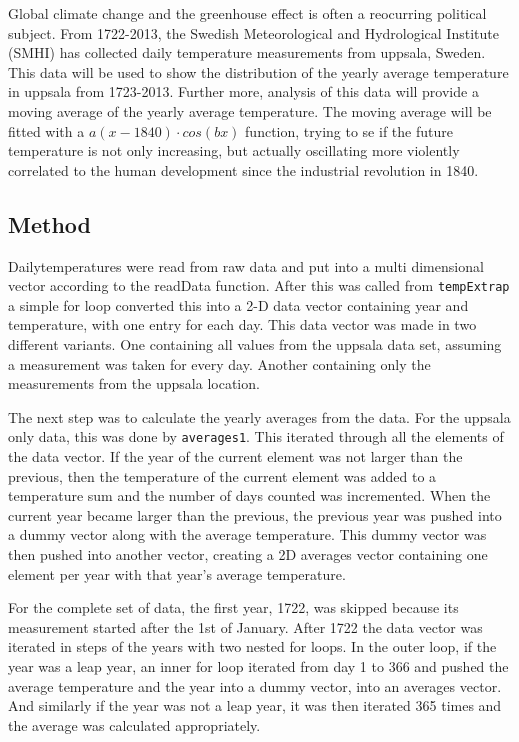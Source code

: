 

Global climate change and the greenhouse effect is often a reocurring political subject. From 1722-2013, the Swedish Meteorological and Hydrological Institute (SMHI) has collected daily temperature measurements from uppsala, Sweden. This data will be used to show the distribution of the yearly average temperature in uppsala from 1723-2013. Further more, analysis of this data will provide a moving average of the yearly average temperature. The moving average will be fitted with a $a(x-1840)\cdot cos(bx)$ function, trying to se if the future temperature is not only increasing, but actually oscillating more violently correlated to the human development since the industrial revolution in 1840.

\subsection{Method}
Dailytemperatures were read from raw data and put into a multi dimensional vector according to the readData function. After this was called from \texttt{tempExtrap} a simple for loop converted this into a 2-D data vector containing year and temperature, with one entry for each day. This data vector was made in two different variants. One containing all values from the uppsala data set, assuming a measurement was taken for every day. Another containing only the measurements from the uppsala location.

The next step was to calculate the yearly averages from the data. For the uppsala only data, this was done by \texttt{averages1}. This iterated through all the elements of the data vector. If the year of the current element was not larger than the previous, then the temperature of the current element was added to a temperature sum and the number of days counted was incremented. When the current year became larger than the previous, the previous year was pushed into a dummy vector along with the average temperature. This dummy vector was then pushed into another vector, creating a 2D averages vector containing one element per year with that year's average temperature.

For the complete set of data, the first year, 1722, was skipped because its measurement started after the 1st of January. After 1722 the data vector was iterated in steps of the years with two nested for loops. In the outer loop, if the year was a leap year, an inner for loop iterated from day 1 to 366 and pushed the average temperature and the year into a dummy vector, into an averages vector. And similarly if the year was not a leap year, it was then iterated 365 times and the average was calculated appropriately.

